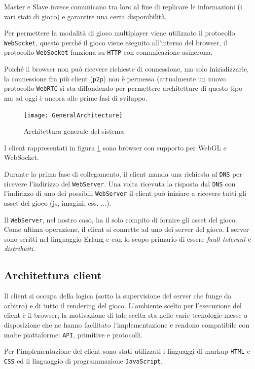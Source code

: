 \documentclass[paper=a4, fontsize=11pt]{scrartcl} %
\numberwithin{equation}{section} %
\numberwithin{figure}{section} %
\numberwithin{table}{section} %
\begin{document}
Master e Slave invece comunicano tra loro al fine di replicare le informazioni (i vari stati di gioco) e garantire una certa disponibilità.

Per permettere la modalità di gioco multiplayer viene utilizzato il protocollo \texttt{WebSocket}, questo perché il gioco viene eseguito all'interno del browser, il protocollo \texttt{WebSocket}
funziona su \texttt{HTTP} con comunicazione asincrona.

Poiché il browser non può ricevere richieste di connessione, ma solo inizializzarle, la connessione fra più client (\texttt{p2p}) non è permessa (attualmente un nuovo protocollo \texttt{WebRTC} si sta
diffondendo per permettere architetture di questo tipo ma ad oggi è ancora alle prime fasi di sviluppo.

\begin{figure}
\centering
\texttt{[image: GeneralArchitecture]}
\caption{Architettura generale del sistema}
\label{GenArc}
\end{figure}

I client rappresentati in figura \ref{GenArc} sono browser con supporto per WebGL e WebSocket.

Durante la prima fase di collegamento, il client manda una richiesta al \texttt{DNS} per ricevere l'indirizzo del \texttt{WebServer}.
Una volta ricevuta la risposta dal \texttt{DNS} con l'indirizzo di uno dei possibili \texttt{WebServer} il client può iniziare a ricevere tutti gli asset del gioco (js, imagini, css, ...).

Il \texttt{WebServer}, nel nostro caso, ha il solo compito di fornire gli asset del gioco. Come ultima operazione, il client si connette ad uno dei server del gioco. I server sono scritti nel linguaggio Erlang e con lo scopo primario di essere \textit{fault tolerant} e \textit{distribuiti}.


\subsection{Architettura client}
Il client si occupa della logica (sotto la supervisione del server che funge da arbitro) e di tutto il rendering del gioco.
L'ambiente scelto per l'esecuzione del client è il browser; la motivazione di tale scelta sta nelle varie tecnologie messe a disposizione che ne hanno facilitato l'implementazione e rendono compatibile con molte piattaforme: \texttt{API}, primitive e protocolli.

Per l'implementazione del client sono stati utilizzati i linguaggi di markup \texttt{HTML} e \texttt{CSS} ed il linguaggio di programmazione \texttt{JavaScript}.
\end{document}
